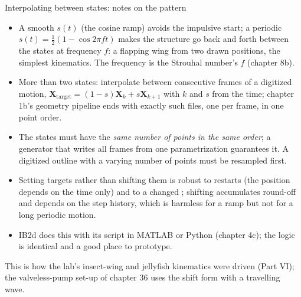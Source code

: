 \documentclass[aspectratio=169,11pt]{beamer}
\begin{document}
\begin{frame}{Interpolating between states: notes on the pattern}
\label{fr:interp2}
\footnotesize
\begin{itemize}
  \item A smooth $s(t)$ (the cosine ramp) avoids the impulsive start; a periodic $s(t) = \tfrac12(1 - \cos 2\pi f t)$ makes the structure go back and forth between the states at frequency $f$: a flapping wing from two drawn positions, the simplest kinematics. The frequency is the Strouhal number's $f$ (chapter 8b).
  \item More than two states: interpolate between consecutive frames of a digitized motion, $\mathbf{X}_{\mathrm{target}} = (1-s)\mathbf{X}_k + s\mathbf{X}_{k+1}$ with $k$ and $s$ from the time; chapter 1b's geometry pipeline ends with exactly such files, one per frame, in one point order.
  \item The states must have the \emph{same number of points in the same order}; a generator that writes all frames from one parametrization guarantees it. A digitized outline with a varying number of points must be resampled first.
  \item Setting targets rather than shifting them is robust to restarts (the position depends on the time only) and to a changed ; shifting accumulates round-off and depends on the step history, which is harmless for a ramp but not for a long periodic motion.
  \item IB2d does this with its  script in MATLAB or Python (chapter 4c); the logic is identical and a good place to prototype.
\end{itemize}
\vspace{1mm}
\small This is how the lab's insect-wing and jellyfish kinematics were driven (Part VI); the valveless-pump set-up of chapter 36 uses the shift form with a travelling wave.
\end{frame}
\end{document}
